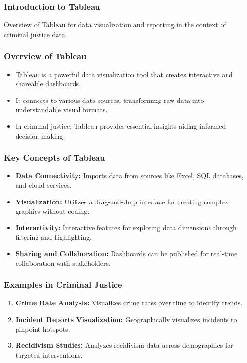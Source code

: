 \documentclass[aspectratio=169]{beamer}
\begin{document}
\begin{frame}[fragile]
    \frametitle{Introduction to Tableau}
    Overview of Tableau for data visualization and reporting in the context of criminal justice data.
\end{frame}

\begin{frame}[fragile]
    \frametitle{Overview of Tableau}
    \begin{itemize}
        \item Tableau is a powerful data visualization tool that creates interactive and shareable dashboards.
        \item It connects to various data sources, transforming raw data into understandable visual formats.
        \item In criminal justice, Tableau provides essential insights aiding informed decision-making.
    \end{itemize}
\end{frame}

\begin{frame}[fragile]
    \frametitle{Key Concepts of Tableau}
    \begin{itemize}
        \item \textbf{Data Connectivity:} Imports data from sources like Excel, SQL databases, and cloud services.
        \item \textbf{Visualization:} Utilizes a drag-and-drop interface for creating complex graphics without coding.
        \item \textbf{Interactivity:} Interactive features for exploring data dimensions through filtering and highlighting.
        \item \textbf{Sharing and Collaboration:} Dashboards can be published for real-time collaboration with stakeholders.
    \end{itemize}
\end{frame}

\begin{frame}[fragile]
    \frametitle{Examples in Criminal Justice}
    \begin{enumerate}
        \item \textbf{Crime Rate Analysis:} Visualizes crime rates over time to identify trends.
        \item \textbf{Incident Reports Visualization:} Geographically visualizes incidents to pinpoint hotspots.
        \item \textbf{Recidivism Studies:} Analyzes recidivism data across demographics for targeted interventions.
    \end{enumerate}
\end{frame}
\end{document}
